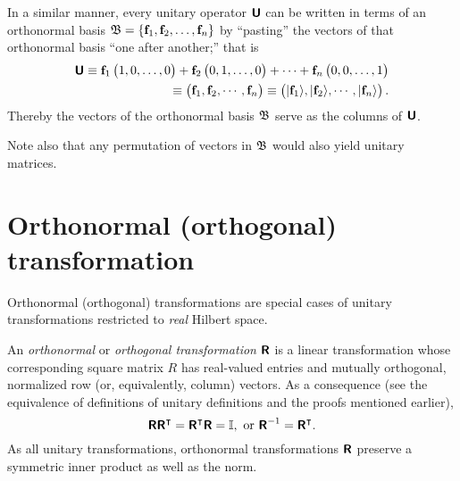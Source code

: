 In a similar manner, every unitary operator  $\textsf{\textbf{U}}$  can be written in terms of an orthonormal basis
${\frak B}=\{{\bf f}_1,  {\bf f}_2, \ldots , {\bf f}_n\}$
by ``pasting'' the  vectors of that orthonormal basis ``one after another;''
that is
\begin{equation}
\begin{split}
\textsf{\textbf{U}}
\equiv
{\bf f}_1 \begin{pmatrix} 1,0,\ldots ,0\end{pmatrix} +
{\bf f}_2 \begin{pmatrix} 0,1,\ldots ,0\end{pmatrix} +
\cdots +
{\bf f}_n \begin{pmatrix} 0,0,\ldots ,1\end{pmatrix}   \\
\equiv
\begin{pmatrix}
{\bf f}_1,
{\bf f}_2,
\cdots,
{\bf f}_n
\end{pmatrix}
\equiv
\begin{pmatrix}
\vert {\bf f}_1 \rangle ,
\vert {\bf f}_2 \rangle ,
\cdots,
\vert {\bf f}_n \rangle
\end{pmatrix}
.
\end{split}
\label{2015-m-ch-fdlvs-uniascolv}
\end{equation}
Thereby the vectors of the orthonormal basis  ${\frak B}$ serve as the
columns of $\textsf{\textbf{U}}$.

Note also that any permutation of vectors in ${\frak B}$ would also yield unitary matrices.


\section{Orthonormal (orthogonal) transformation}
\label{2015-m-ch-fdlvs-orthproj}

Orthonormal (orthogonal) transformations are special cases of unitary transformations restricted to {\em real} Hilbert space.

An {\em orthonormal} or {\em orthogonal transformation} $\textsf{\textbf{R}}$ is a linear transformation
whose corresponding square matrix $R$ has real-valued entries
and mutually orthogonal, normalized row (or, equivalently, column) vectors.
As a consequence (see the equivalence of definitions of unitary definitions and the proofs mentioned earlier),
\begin{equation}
\textsf{\textbf{R}}\textsf{\textbf{R}}^\intercal = \textsf{\textbf{R}}^\intercal \textsf{\textbf{R}}= {\Bbb I},
\textrm{ or } \textsf{\textbf{R}}^{-1}=\textsf{\textbf{R}}^\intercal  .
\end{equation}
As all unitary transformations, orthonormal transformations $\textsf{\textbf{R}}$
preserve a symmetric inner product as well as the norm.

